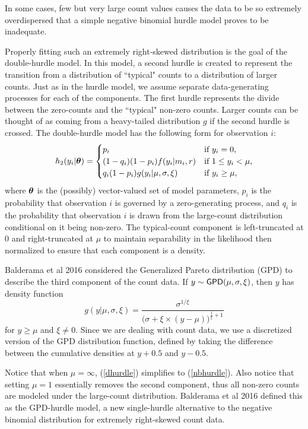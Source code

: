 \documentclass[article]{jss}
\newcommand{\btheta}{\mbox{\boldmath $\theta$} }
\providecommand{\Paren}[1]{\Big(#1\Big)}
\newcommand{\GPD}{\mbox{{\sf GPD}}}
\begin{document}
In some cases, few but very large count values causes the data to be so extremely overdispersed that a simple negative binomial hurdle model proves to be inadequate. 

Properly fitting such an extremely right-skewed distribution is the goal of the double-hurdle model. In this model, a second hurdle is created to represent the transition from a distribution of ``typical" counts to a distribution of larger counts. Just as in the hurdle model, we assume separate data-generating processes for each of the components. The first hurdle represents the divide between the zero-counts and the ``typical" non-zero counts. Larger counts can be thought of as coming from a heavy-tailed distribution $g$ if the second hurdle is crossed. The double-hurdle model has the following form for observation $i$: 
\begin{equation}
\label{dhurdle}
  h_2(y_i | \btheta) = 
 \begin{cases}
  p_i & \mbox{if } y_i=0,\\
 (1-q_i)(1-p_i)f(y_i | m_i, r)  & \mbox{if } 1\le y_i < \mu,\\
  q_i(1-p_i)g(y_i | \mu, \sigma, \xi)  & \mbox{if } y_i \ge \mu,
  \end{cases}
\end{equation}
where $\btheta$ is the (possibly) vector-valued set of model parameters, $p_i$ is the probability that observation $i$ is governed by a zero-generating process, and $q_i$ is the probability that observation $i$ is drawn from the large-count distribution conditional on it being non-zero. The typical-count component is left-truncated at 0 and right-truncated at $\mu$ to maintain separability in the likelihood then normalized to ensure that each component is a density. 


Balderama et al 2016 considered the Generalized Pareto distribution (GPD) to describe the third component of the count data. If $y \sim \GPD(\mu, \sigma, \xi)$, then $y$ has density function
\begin{equation}
 g(y | \mu, \sigma, \xi) = \dfrac{\sigma^{1/\xi}}{\Paren{\sigma + \xi \times (y-\mu)}^{\frac{1}{\xi}+1}}
\end{equation}
for $y\ge\mu$ and $\xi \ne 0$. Since we are dealing with count data, we use a discretized version of the GPD distribution function, defined by taking the difference between the cumulative densities at $y+0.5$ and $y-0.5$. 


Notice that when $\mu=\infty$, (\ref{dhurdle}) simplifies to (\ref{nbhurdle}). Also notice that setting $\mu=1$ essentially removes the second component, thus all non-zero counts are modeled under the large-count distribution. Balderama et al 2016 defined this as the GPD-hurdle model, a new single-hurdle alternative to the negative binomial distribution for extremely right-skewed count data.
\end{document}
